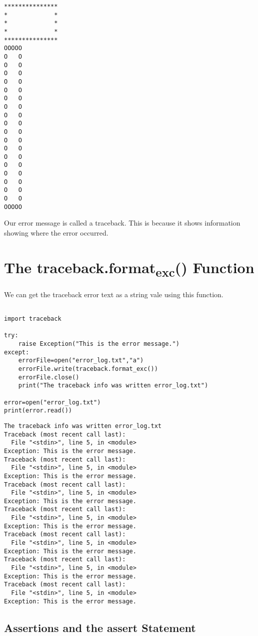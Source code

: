 \documentclass[11pt]{article}
\begin{document}
\begin{verbatim}
***************
*             *
*             *
*             *
***************
OOOOO
O   O
O   O
O   O
O   O
O   O
O   O
O   O
O   O
O   O
O   O
O   O
O   O
O   O
O   O
O   O
O   O
O   O
O   O
OOOOO
\end{verbatim}

Our error message is called a traceback. This is because it shows information showing where the error occurred.

\section{The traceback.format\textsubscript{exc}() Function}
\label{sec:orgce6c1a3}

We can get the traceback error text as a string vale using this function.


\begin{verbatim}

import traceback

try:
    raise Exception("This is the error message.")
except:
    errorFile=open("error_log.txt","a")
    errorFile.write(traceback.format_exc())
    errorFile.close()
    print("The traceback info was written error_log.txt")

error=open("error_log.txt")
print(error.read())

\end{verbatim}

\begin{verbatim}
The traceback info was written error_log.txt
Traceback (most recent call last):
  File "<stdin>", line 5, in <module>
Exception: This is the error message.
Traceback (most recent call last):
  File "<stdin>", line 5, in <module>
Exception: This is the error message.
Traceback (most recent call last):
  File "<stdin>", line 5, in <module>
Exception: This is the error message.
Traceback (most recent call last):
  File "<stdin>", line 5, in <module>
Exception: This is the error message.
Traceback (most recent call last):
  File "<stdin>", line 5, in <module>
Exception: This is the error message.
Traceback (most recent call last):
  File "<stdin>", line 5, in <module>
Exception: This is the error message.
Traceback (most recent call last):
  File "<stdin>", line 5, in <module>
Exception: This is the error message.

\end{verbatim}

\subsection{Assertions and the assert Statement}
\label{sec:orgb318a36}
\end{document}
